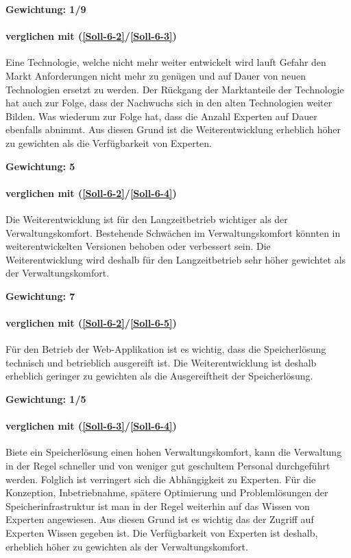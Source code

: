 \textbf{Gewichtung: 1/9}

\paragraph*{ verglichen mit  (\ref{Soll-6-2}/\ref{Soll-6-3})}
Eine Technologie, welche nicht mehr weiter entwickelt wird lauft Gefahr den Markt Anforderungen nicht mehr zu genügen und auf Dauer von neuen Technologien ersetzt zu werden. Der Rückgang der Marktanteile der Technologie hat auch zur Folge, dass der Nachwuchs sich in den alten Technologien weiter Bilden. Was wiederum zur Folge hat, dass die Anzahl Experten auf Dauer ebenfalls abnimmt. Aus diesen Grund ist die Weiterentwicklung erheblich höher zu gewichten als die Verfügbarkeit von Experten.

\textbf{Gewichtung: 5}

\paragraph*{ verglichen mit  (\ref{Soll-6-2}/\ref{Soll-6-4})}

Die Weiterentwicklung ist für den Langzeitbetrieb wichtiger als der Verwaltungskomfort. Bestehende Schwächen im Verwaltungskomfort könnten in weiterentwickelten Versionen behoben oder verbessert sein. Die Weiterentwicklung wird deshalb für den Langzeitbetrieb sehr höher gewichtet als der Verwaltungskomfort.

\textbf{Gewichtung: 7}

\paragraph*{ verglichen mit  (\ref{Soll-6-2}/\ref{Soll-6-5})}
Für den Betrieb der Web-Applikation ist es wichtig, dass die Speicherlösung technisch und betrieblich ausgereift ist. Die Weiterentwicklung ist deshalb erheblich geringer zu gewichten als die Ausgereiftheit der Speicherlösung.

\textbf{Gewichtung: 1/5}


\paragraph*{ verglichen mit  (\ref{Soll-6-3}/\ref{Soll-6-4})}
Biete ein Speicherlösung einen hohen Verwaltungskomfort, kann die Verwaltung in der Regel schneller und von weniger gut geschultem Personal durchgeführt werden. Folglich ist verringert sich die Abhängigkeit zu Experten. Für die Konzeption, Inbetriebnahme, spätere Optimierung und Problemlösungen der Speicherinfrastruktur ist man in der Regel weiterhin auf das Wissen von Experten angewiesen. Aus diesen Grund ist es wichtig das der Zugriff auf Experten Wissen gegeben ist. Die Verfügbarkeit von Experten ist deshalb, erheblich höher zu gewichten als der Verwaltungskomfort. 

